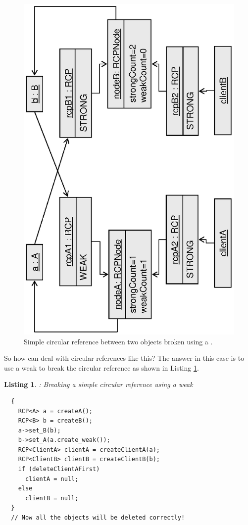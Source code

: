 \documentclass[pdf,ps2pdf,11pt]{SANDreport}
\newtheorem{listing}{Listing}
\begin{document}
{\bsinglespace
\begin{figure}
\begin{center}
\includegraphics*[angle=270,scale=0.65]{CircularRCP_A_B_weak}
\end{center}
\caption{
\label{fig:CircularRCP_A_B_weak}
Simple circular reference between two objects broken using a
{} {}.  }
\end{figure}
\esinglespace}

So how can deal with circular references like this?  The answer in
this case is to use a weak {} to break the circular
reference as shown in Listing {}\ref{listing:CircularRCP_A_B_weak}.


\begin{listing}: Breaking a simple circular reference using a weak
{} \\
\label{listing:CircularRCP_A_B_weak}
{\small\begin{verbatim}
  {
    RCP<A> a = createA();
    RCP<B> b = createB();
    a->set_B(b);
    b->set_A(a.create_weak());
    RCP<ClientA> clientA = createClientA(a);
    RCP<ClientB> clientB = createClientB(b);
    if (deleteClientAFirst)
      clientA = null;
    else
      clientB = null;
  }
  // Now all the objects will be deleted correctly!
\end{verbatim}}
\end{listing}
\end{document}
